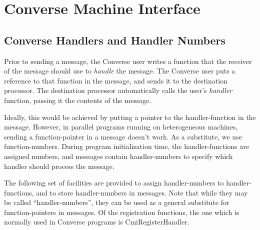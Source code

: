 \chapter{Converse Machine Interface}



\section{Converse Handlers and Handler Numbers}

Prior to sending a message, the Converse user writes a function that
the receiver of the message should use to {\em handle} the message.
The Converse user puts a reference to that function in the message,
and sends it to the destination processor.  The destination processor
automatically calls the user's {\em handler} function, passing it the
contents of the message.

Ideally, this would be achieved by putting a pointer to the
handler-function in the message.  However, in parallel programs
running on heterogeneous machines, sending a function-pointer in a
message doesn't work.  As a substitute, we use function-numbers.
During program initialization time, the handler-functions are assigned
numbers, and messages contain handler-numbers to specify which handler
should process the message.  

The following set of facilities are provided to assign handler-numbers
to handler-functions, and to store handler-numbers in messages.  Note
that while they may be called ``handler-numbers'', they can be used as
a general substitute for function-pointers in messages.  Of the
registration functions, the one which is normally used in Converse
programs is CmiRegisterHandler.

